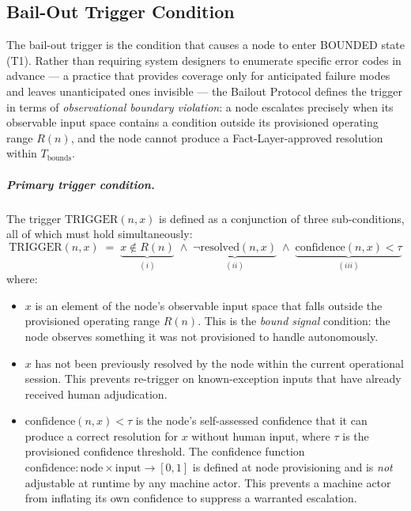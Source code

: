\subsection{Bail-Out Trigger Condition}\label{sec:bailout-trigger}

The bail-out trigger is the condition that causes a node to enter BOUNDED state (T1). Rather than requiring system designers to enumerate specific error codes in advance — a practice that provides coverage only for anticipated failure modes and leaves unanticipated ones invisible — the Bailout Protocol defines the trigger in terms of \emph{observational boundary violation}: a node escalates precisely when its observable input space contains a condition outside its provisioned operating range $R(n)$, and the node cannot produce a Fact-Layer-approved resolution within $T_{\text{bounds}}$.

\subparagraph{Primary trigger condition.} The trigger $\text{TRIGGER}(n, x)$ is defined as a conjunction of three sub-conditions, all of which must hold simultaneously:
\begin{equation}
\text{TRIGGER}(n, x) \;=\; \underbrace{x \notin R(n)}_{(i)} \;\land\; \underbrace{\neg\text{resolved}(n, x)}_{(ii)} \;\land\; \underbrace{\text{confidence}(n, x) < \tau}_{(iii)} \tag{TC}
\end{equation}
where:

\begin{itemize}\itemsep0em
\item[(i)] $x$ is an element of the node's observable input space that falls outside the provisioned operating range $R(n)$. This is the \emph{bound signal} condition: the node observes something it was not provisioned to handle autonomously.
\item[(ii)] $x$ has not been previously resolved by the node within the current operational session. This prevents re-trigger on known-exception inputs that have already received human adjudication.
\item[(iii)] $\text{confidence}(n, x) < \tau$ is the node's self-assessed confidence that it can produce a correct resolution for $x$ without human input, where $\tau$ is the provisioned confidence threshold. The confidence function $\text{confidence} : \text{node} \times \text{input} \rightarrow [0, 1]$ is defined at node provisioning and is \emph{not} adjustable at runtime by any machine actor. This prevents a machine actor from inflating its own confidence to suppress a warranted escalation.
\end{itemize}

